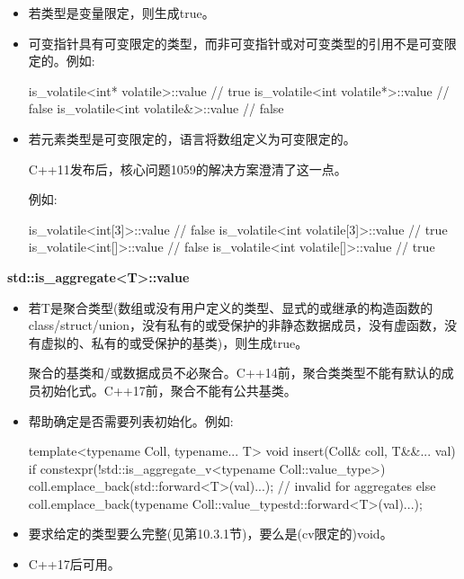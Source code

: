 \begin{itemize}
\item 
若类型是变量限定，则生成true。

\item 
可变指针具有可变限定的类型，而非可变指针或对可变类型的引用不是可变限定的。例如:

\begin{cpp}
is_volatile<int* volatile>::value // true
is_volatile<int volatile*>::value // false
is_volatile<int volatile&>::value // false
\end{cpp}

\item 
若元素类型是可变限定的，语言将数组定义为可变限定的。

\begin{notice}
C++11发布后，核心问题1059的解决方案澄清了这一点。
\end{notice}

例如:
\begin{cpp}
is_volatile<int[3]>::value // false
is_volatile<int volatile[3]>::value // true
is_volatile<int[]>::value // false
is_volatile<int volatile[]>::value // true
\end{cpp}
\end{itemize}

\textbf{std::is\_aggregate<T>::value}

\begin{itemize}
\item 
若T是聚合类型(数组或没有用户定义的类型、显式的或继承的构造函数的class/struct/union，没有私有的或受保护的非静态数据成员，没有虚函数，没有虚拟的、私有的或受保护的基类)，则生成true。

\begin{notice}
聚合的基类和/或数据成员不必聚合。C++14前，聚合类类型不能有默认的成员初始化式。C++17前，聚合不能有公共基类。
\end{notice}

\item 
帮助确定是否需要列表初始化。例如:
\begin{cpp}
template<typename Coll, typename... T>
void insert(Coll& coll, T&&... val)
{
	if constexpr(!std::is_aggregate_v<typename Coll::value_type>) {
		coll.emplace_back(std::forward<T>(val)...); // invalid for aggregates
	}
	else {
		coll.emplace_back(typename Coll::value_type{std::forward<T>(val)...});
	}
}
\end{cpp}

\item 
要求给定的类型要么完整(见第10.3.1节)，要么是(cv限定的)void。

\item 
C++17后可用。
\end{itemize}

